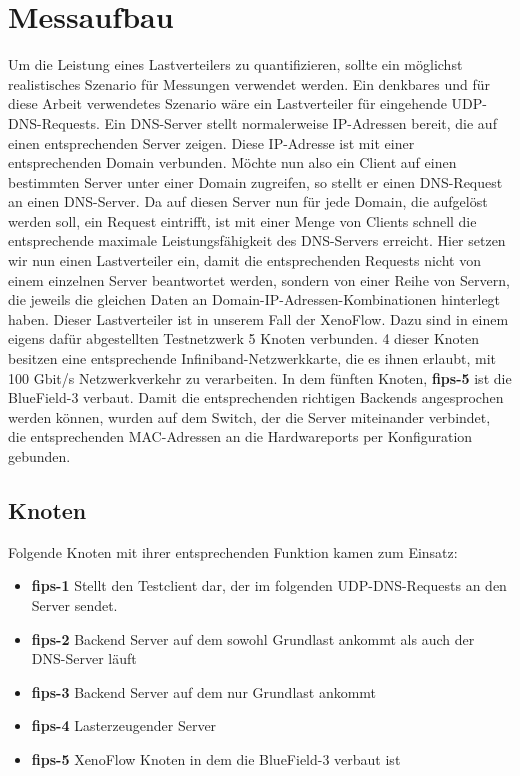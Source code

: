 \section{Messaufbau}
Um die Leistung eines Lastverteilers zu quantifizieren, sollte ein möglichst realistisches Szenario für Messungen verwendet werden. Ein denkbares und für diese Arbeit verwendetes Szenario wäre ein Lastverteiler für eingehende UDP-DNS-Requests. Ein DNS-Server stellt normalerweise IP-Adressen bereit, die auf einen entsprechenden Server zeigen. Diese IP-Adresse ist mit einer entsprechenden Domain verbunden. Möchte nun also ein Client auf einen bestimmten Server unter einer Domain zugreifen, so stellt er einen DNS-Request an einen DNS-Server. Da auf diesen Server nun für jede Domain, die aufgelöst werden soll, ein Request eintrifft, ist mit einer Menge von Clients schnell die entsprechende maximale Leistungsfähigkeit des DNS-Servers erreicht. Hier setzen wir nun einen Lastverteiler ein, damit die entsprechenden Requests nicht von einem einzelnen Server beantwortet werden, sondern von einer Reihe von Servern, die jeweils die gleichen Daten an Domain-IP-Adressen-Kombinationen hinterlegt haben. Dieser Lastverteiler ist in unserem Fall der XenoFlow. Dazu sind in einem eigens dafür abgestellten Testnetzwerk 5 Knoten verbunden. 4 dieser Knoten besitzen eine entsprechende Infiniband-Netzwerkkarte, die es ihnen erlaubt, mit 100 Gbit/s Netzwerkverkehr zu verarbeiten. In dem fünften Knoten, \textbf{fips-5} ist die BlueField-3 verbaut. Damit die entsprechenden richtigen Backends angesprochen werden können, wurden auf dem Switch, der die Server miteinander verbindet, die entsprechenden MAC-Adressen an die Hardwareports per Konfiguration gebunden.
\subsection{Knoten}
Folgende Knoten mit ihrer entsprechenden Funktion kamen zum Einsatz:
\begin{itemize}
    \item \textbf{fips-1} Stellt den Testclient dar, der im folgenden UDP-DNS-Requests an den Server sendet.
    \item \textbf{fips-2} Backend Server auf dem sowohl Grundlast ankommt als auch der DNS-Server läuft
    \item \textbf{fips-3} Backend Server auf dem nur Grundlast ankommt
    \item \textbf{fips-4} Lasterzeugender Server
    \item \textbf{fips-5} XenoFlow Knoten in dem die BlueField-3 verbaut ist
\end{itemize}
